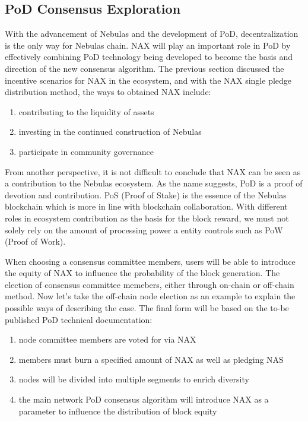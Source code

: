 \subsection{PoD Consensus Exploration}
With the advancement of Nebulas and the development of PoD, decentralization is the only way for Nebulas chain. NAX will play an important role in PoD by effectively combining PoD technology being developed to become the basis and direction of the new consensus algorithm. The previous section discussed the incentive scenarios for NAX in the ecosystem, and with the NAX single pledge distribution method, the ways to obtained NAX include:

\begin{enumerate}[\hspace{1cm}(i)]
  \item contributing to the liquidity of assets
  \item investing in the continued construction of Nebulas
  \item participate in community governance
\end{enumerate}

From another perspective, it is not difficult to conclude that NAX can be seen as a contribution to the Nebulas ecosystem. As the name suggests, PoD is a proof of devotion and contribution. PoS (Proof of Stake) is the essence of the Nebulas blockchain which is more in line with blockchain collaboration. With different roles in ecosystem contribution as the basis for the block reward, we must not solely rely on the amount of processing power a entity controls such as PoW (Proof of Work).

When choosing a consensus committee members, users will be able to introduce the equity of NAX to influence the probability of the block generation. The election of consensus committee memebers, either through on-chain or off-chain method. Now let's take the off-chain node election as an example to explain the possible ways of describing the case. The final form will be based on the to-be published PoD technical documentation:

\begin{enumerate}[\hspace{1cm}(a)]
  \item node committee members are voted for via NAX
  \item members must burn a specified amount of NAX as well as pledging NAS
  \item nodes will be divided into multiple segments to enrich diversity
  \item the main network PoD consensus algorithm will introduce NAX as a parameter to influence the distribution of block equity
\end{enumerate}

